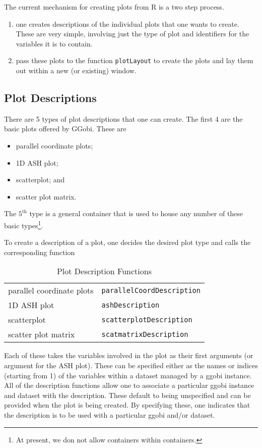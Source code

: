 \documentclass{article}
\def\SFunction#1{{\texttt{\red #1}}}
\begin{document}
The current mechanism for creating plots from R is a two step process.
\begin{enumerate}
\item one creates descriptions of the individual plots that one
wants to create. These are very simple, involving just the type of
plot and identifiers for the variables it is to contain.
\item pass these plots to the function
\SFunction{plotLayout} to create the plots and lay them out within
a new (or existing) window.
\end{enumerate}

\subsection{Plot Descriptions}
There are 5 types of plot descriptions that one can create.
The first 4 are the basic plots offered by GGobi.
These are
\begin{itemize}
\item parallel coordinate plots;
\item 1D ASH plot;
\item scatterplot; and
\item scatter plot matrix. 
\end{itemize}
The $5^{\mbox{th}}$ type is a general container that 
is used to house any number of these basic types\footnote{At present,
we don not allow containers within containers.}.

To create a description of a plot, one decides the desired plot type
and calls the corresponding function
\begin{table}[htbp]
  \begin{center}
    \leavevmode
    \begin{tabular}{ll}
 parallel coordinate plots & 
\SFunction{parallelCoordDescription}
\\
 1D ASH plot & 
\SFunction{ashDescription}
\\
 scatterplot & 
\SFunction{scatterplotDescription}
\\
 scatter plot matrix & 
\SFunction{scatmatrixDescription}
\\
    \end{tabular}
    \caption{Plot Description Functions}
    \label{tab:PlotDescriptions}
  \end{center}
\end{table}
Each of these takes the variables involved in the plot as their first
arguments (or argument for the ASH plot).  These can be specified
either as the names or indices (starting from 1) of the variables
within a dataset managed by a ggobi instance.  All of the description
functions allow one to associate a particular ggobi instance and
dataset with the description.   These default to being unspecified
and can be provided when the plot is being created.
By specifying these, one indicates that
the description is to be used with a particular ggobi and/or dataset.
\end{document}
